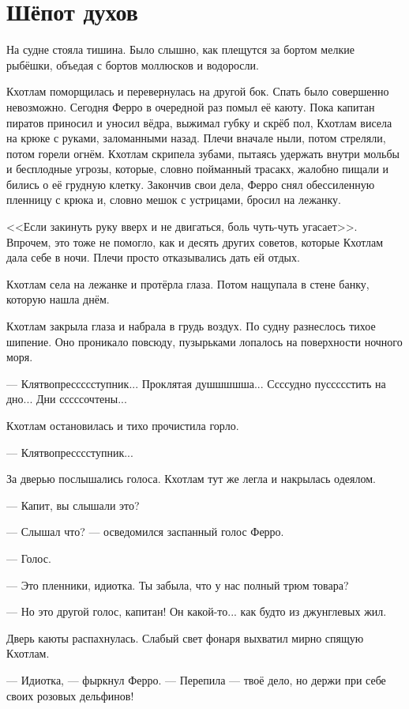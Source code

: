\section{Шёпот духов}

На судне стояла тишина.
Было слышно, как плещутся за бортом мелкие рыбёшки, объедая с бортов моллюсков и водоросли.

Кхотлам поморщилась и перевернулась на другой бок.
Спать было совершенно невозможно.
Сегодня Ферро в очередной раз помыл её каюту.
Пока капитан пиратов приносил и уносил вёдра, выжимал губку и скрёб пол, Кхотлам висела на крюке с руками, заломанными назад.
Плечи вначале ныли, потом стреляли, потом горели огнём.
Кхотлам скрипела зубами, пытаясь удержать внутри мольбы и бесплодные угрозы, которые, словно пойманный трасакх, жалобно пищали и бились о её грудную клетку.
Закончив свои дела, Ферро снял обессиленную пленницу с крюка и, словно мешок с устрицами, бросил на лежанку.

<<Если закинуть руку вверх и не двигаться, боль чуть-чуть угасает>>.
Впрочем, это тоже не помогло, как и десять других советов, которые Кхотлам дала себе в ночи.
Плечи просто отказывались дать ей отдых.

Кхотлам села на лежанке и протёрла глаза.
Потом нащупала в стене банку, которую нашла днём.

Кхотлам закрыла глаза и набрала в грудь воздух.
По судну разнеслось тихое шипение.
Оно проникало повсюду, пузырьками лопалось на поверхности ночного моря.

--- Клятвопрессссступник...
Проклятая душшшшша...
Ссссудно пуссссстить на дно...
Дни сссссочтены...

Кхотлам остановилась и тихо прочистила горло.

--- Клятвопресссступник...

За дверью послышались голоса.
Кхотлам тут же легла и накрылась одеялом.

--- Капит, вы слышали это?

--- Слышал что? --- осведомился заспанный голос Ферро.

--- Голос.

--- Это пленники, идиотка.
Ты забыла, что у нас полный трюм товара?

--- Но это другой голос, капитан!
Он какой-то... как будто из джунглевых жил.

Дверь каюты распахнулась.
Слабый свет фонаря выхватил мирно спящую Кхотлам.

--- Идиотка, --- фыркнул Ферро.
--- Перепила --- твоё дело, но держи при себе своих розовых дельфинов!

